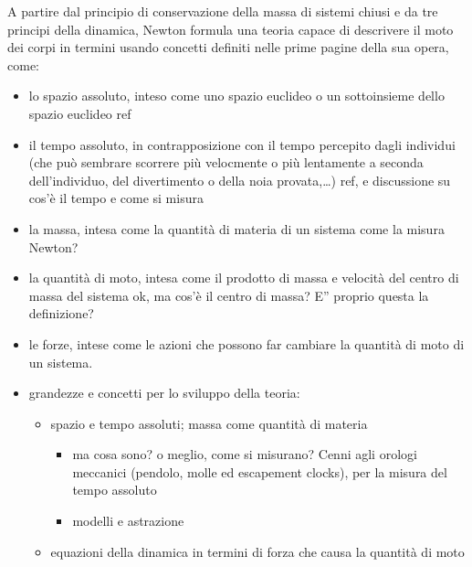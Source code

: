 \documentclass[letterpaper,10pt,italian]{jupyterBook}
\begin{document}
\sphinxAtStartPar
A partire dal principio di conservazione della massa di sistemi chiusi e da tre principi della dinamica, Newton formula una teoria capace di descrivere il moto dei corpi in termini usando concetti definiti nelle prime pagine della sua opera, come:
\begin{itemize}
\item {} 
\sphinxAtStartPar
lo spazio assoluto, inteso come uno spazio euclideo o un sottoinsieme dello spazio euclideo  ref

\item {} 
\sphinxAtStartPar
il tempo assoluto, in contrapposizione con il tempo percepito dagli individui (che può sembrare scorrere più velocmente o più lentamente a seconda dell’individuo, del divertimento o della noia provata,…)  ref, e discussione su cos’è il tempo e come si misura

\item {} 
\sphinxAtStartPar
la massa, intesa come la quantità di materia di un sistema  come la misura Newton?

\item {} 
\sphinxAtStartPar
la quantità di moto, intesa come il prodotto di massa e velocità del centro di massa del sistema  ok, ma cos’è il centro di massa? E” proprio questa la definizione?

\item {} 
\sphinxAtStartPar
le forze, intese come le azioni che possono far cambiare la quantità di moto di un sistema.

\item {} 
\sphinxAtStartPar
grandezze e concetti per lo sviluppo della teoria:
\begin{itemize}
\item {} 
\sphinxAtStartPar
spazio e tempo assoluti; massa come quantità di materia
\begin{itemize}
\item {} 
\sphinxAtStartPar
ma cosa sono? o meglio, come si misurano? Cenni agli orologi meccanici (pendolo, molle ed escapement clocks), per la misura del tempo assoluto

\item {} 
\sphinxAtStartPar
modelli e astrazione

\end{itemize}

\item {} 
\sphinxAtStartPar
equazioni della dinamica in termini di forza che causa la quantità di moto


\end{itemize}
\end{itemize}
\end{document}
